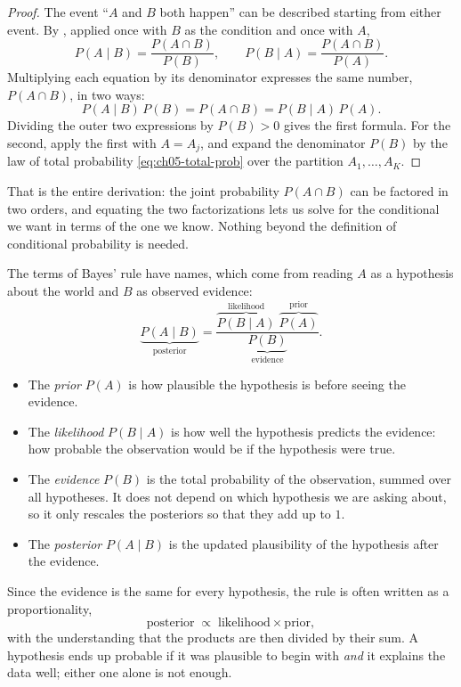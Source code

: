 \begin{proof}
  The event ``$A$ and $B$ both happen'' can be described starting from
  either event. By , applied once with $B$ as the
  condition and once with $A$,
  \[
    P(A \mid B) = \frac{P(A \cap B)}{P(B)},
    \qquad
    P(B \mid A) = \frac{P(A \cap B)}{P(A)} .
  \]
  Multiplying each equation by its denominator expresses the same
  number, $P(A \cap B)$, in two ways:
  \[
    P(A \mid B)\, P(B) = P(A \cap B) = P(B \mid A)\, P(A) .
  \]
  Dividing the outer two expressions by $P(B) > 0$ gives the first
  formula. For the second, apply the first with $A = A_j$, and expand the
  denominator $P(B)$ by the law of total probability
  \eqref{eq:ch05-total-prob} over the partition $A_1, \dots, A_K$.
\end{proof}

That is the entire derivation: the joint probability $P(A \cap B)$ can
be factored in two orders, and equating the two factorizations lets us
solve for the conditional we want in terms of the one we know. Nothing
beyond the definition of conditional probability is needed.

The terms of Bayes' rule have names, which come from reading $A$ as a
hypothesis about the world and $B$ as observed evidence:
\[
  \underbrace{P(A \mid B)}_{\text{posterior}}
  = \frac{\overbrace{P(B \mid A)}^{\text{likelihood}}\;
          \overbrace{P(A)}^{\text{prior}}}
         {\underbrace{P(B)}_{\text{evidence}}} .
\]
\begin{itemize}
  \item The \emph{prior} $P(A)$ is how plausible the hypothesis is before
    seeing the evidence.
  \item The \emph{likelihood} $P(B \mid A)$ is how well the hypothesis
    predicts the evidence: how probable the observation would be if
    the hypothesis were true.
  \item The \emph{evidence} $P(B)$ is the total probability of the
    observation, summed over all hypotheses. It does not depend on which
    hypothesis we are asking about, so it only rescales the posteriors
    so that they add up to $1$.
  \item The \emph{posterior} $P(A \mid B)$ is the updated plausibility of
    the hypothesis after the evidence.
\end{itemize}
Since the evidence is the same for every hypothesis, the rule is often
written as a proportionality,
\begin{equation}
  \text{posterior} \;\propto\; \text{likelihood} \times \text{prior},
  \label{eq:ch05-bayes-prop}
\end{equation}
with the understanding that the products are then divided by their sum.
A hypothesis ends up probable if it was plausible to begin with
\emph{and} it explains the data well; either one alone is not enough.


